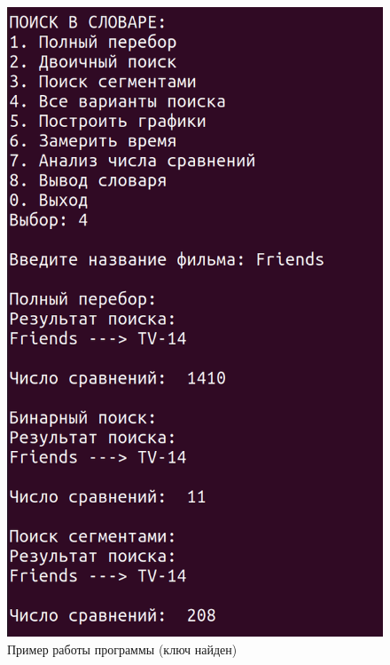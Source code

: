 \begin{figure}[H]
	\begin{center}
		\includegraphics[scale=0.3]{img/example-yes.png}
	\end{center}
	\captionsetup{justification=centering}
	\caption{Пример работы программы (ключ найден)}
	\label{img:example-yes}
\end{figure}

